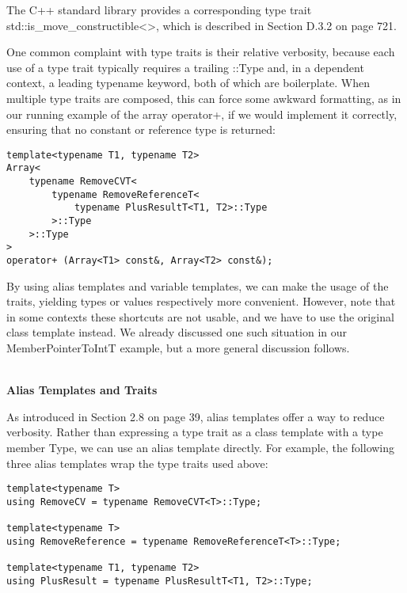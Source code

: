The C++ standard library provides a corresponding type trait std::is\_move\_constructible<>, which is described in Section D.3.2 on page 721.


One common complaint with type traits is their relative verbosity, because each use of a type trait typically requires a trailing ::Type and, in a dependent context, a leading typename keyword, both of which are boilerplate. When multiple type traits are composed, this can force some awkward formatting, as in our running example of the array operator+, if we would implement it correctly, ensuring that no constant or reference type is returned:

\begin{lstlisting}[style=styleCXX]
template<typename T1, typename T2>
Array<
	typename RemoveCVT<
		typename RemoveReferenceT<
			typename PlusResultT<T1, T2>::Type
		>::Type
	>::Type
>
operator+ (Array<T1> const&, Array<T2> const&);
\end{lstlisting}

By using alias templates and variable templates, we can make the usage of the traits, yielding types or values respectively more convenient. However, note that in some contexts these shortcuts are not usable, and we have to use the original class template instead. We already discussed one such situation in our MemberPointerToIntT example, but a more general discussion follows.

\hspace*{\fill} \\ %
\noindent
\textbf{Alias Templates and Traits}

As introduced in Section 2.8 on page 39, alias templates offer a way to reduce verbosity. Rather than expressing a type trait as a class template with a type member Type, we can use an alias template directly. For example, the following three alias templates wrap the type traits used above:

\begin{lstlisting}[style=styleCXX]
template<typename T>
using RemoveCV = typename RemoveCVT<T>::Type;

template<typename T>
using RemoveReference = typename RemoveReferenceT<T>::Type;

template<typename T1, typename T2>
using PlusResult = typename PlusResultT<T1, T2>::Type;
\end{lstlisting}

